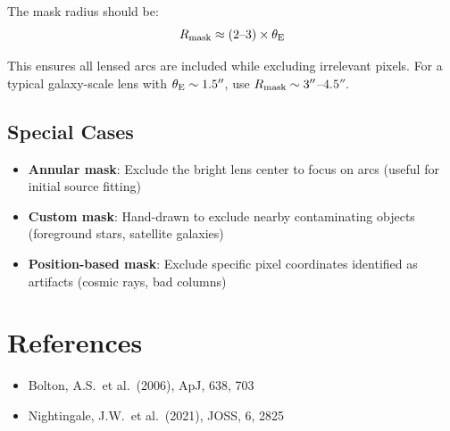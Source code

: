 \documentclass[11pt, letterpaper]{article}
\begin{document}
The mask radius should be:
\begin{equation}
R_{\rm mask} \approx (2\text{--}3) \times \theta_{\rm E}
\end{equation}

This ensures all lensed arcs are included while excluding irrelevant pixels.
For a typical galaxy-scale lens with $\theta_{\rm E} \sim 1.5''$, use
$R_{\rm mask} \sim 3''$--$4.5''$.

\subsection{Special Cases}

\begin{itemize}[nosep]
  \item \textbf{Annular mask}: Exclude the bright lens center to focus on arcs
    (useful for initial source fitting)
  \item \textbf{Custom mask}: Hand-drawn to exclude nearby contaminating objects
    (foreground stars, satellite galaxies)
  \item \textbf{Position-based mask}: Exclude specific pixel coordinates
    identified as artifacts (cosmic rays, bad columns)
\end{itemize}

\section*{References}

\begin{itemize}[nosep, leftmargin=*]
  \item Bolton, A.S.\ et al.\ (2006), ApJ, 638, 703
  \item Nightingale, J.W.\ et al.\ (2021), JOSS, 6, 2825
\end{itemize}
\end{document}
